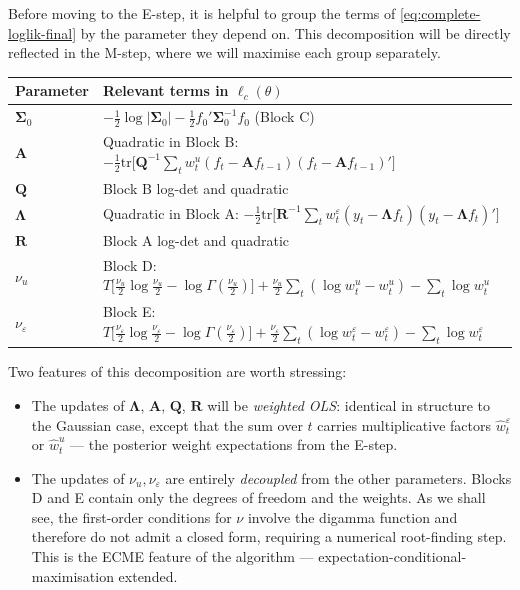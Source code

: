 \documentclass[11pt, a4paper, oneside]{article}
\newcommand{\mL}{\boldsymbol{\Lambda}}
\newcommand{\mA}{\mathbf{A}}
\newcommand{\mR}{\mathbf{R}}
\newcommand{\mQ}{\mathbf{Q}}
\begin{document}
Before moving to the E-step, it is helpful to group the terms of
\eqref{eq:complete-loglik-final} by the parameter they depend on.
This decomposition will be directly reflected in the M-step, where we
will maximise each group separately.

\begin{center}
\renewcommand{\arraystretch}{1.4}
\begin{tabular}{@{}p{2.2cm} p{11.5cm}@{}}
\toprule
\textbf{Parameter} & \textbf{Relevant terms in $\ell_c(\theta)$} \\
\midrule
$\boldsymbol{\Sigma}_0$ & $-\tfrac{1}{2}\log|\boldsymbol{\Sigma}_0| - \tfrac{1}{2}f_0'\boldsymbol{\Sigma}_0^{-1}f_0$ (Block C) \\
$\mA$ & Quadratic in Block B: $-\tfrac{1}{2}\mathrm{tr}\!\big[\mQ^{-1}\sum_t w^u_t (f_t - \mA f_{t-1})(f_t - \mA f_{t-1})'\big]$ \\
$\mQ$ & Block B log-det and quadratic \\
$\mL$ & Quadratic in Block A: $-\tfrac{1}{2}\mathrm{tr}\!\big[\mR^{-1}\sum_t w^\varepsilon_t (y_t - \mL f_t)(y_t - \mL f_t)'\big]$ \\
$\mR$ & Block A log-det and quadratic \\
$\nu_u$ & Block D: $T\big[\tfrac{\nu_u}{2}\log\tfrac{\nu_u}{2} - \log\Gamma(\tfrac{\nu_u}{2})\big] + \tfrac{\nu_u}{2}\sum_t(\log w^u_t - w^u_t) - \sum_t \log w^u_t$ \\
$\nu_\varepsilon$ & Block E: $T\big[\tfrac{\nu_\varepsilon}{2}\log\tfrac{\nu_\varepsilon}{2} - \log\Gamma(\tfrac{\nu_\varepsilon}{2})\big] + \tfrac{\nu_\varepsilon}{2}\sum_t(\log w^\varepsilon_t - w^\varepsilon_t) - \sum_t \log w^\varepsilon_t$ \\
\bottomrule
\end{tabular}
\end{center}

Two features of this decomposition are worth stressing:

\begin{itemize}[leftmargin=1.5em, itemsep=3pt]
    \item The updates of $\mL$, $\mA$, $\mQ$, $\mR$ will be
          \emph{weighted OLS}: identical in structure to the Gaussian
          case, except that the sum over $t$ carries multiplicative
          factors $\hat{w}^\varepsilon_t$ or $\hat{w}^u_t$ — the
          posterior weight expectations from the E-step.
    \item The updates of $\nu_u, \nu_\varepsilon$ are entirely
          \emph{decoupled} from the other parameters. Blocks D and E
          contain only the degrees of freedom and the weights. As we
          shall see, the first-order conditions for $\nu$ involve the
          digamma function and therefore do not admit a closed form,
          requiring a numerical root-finding step. This is the ECME
          feature of the algorithm — expectation-conditional-maximisation
          extended.
\end{itemize}
\end{document}
